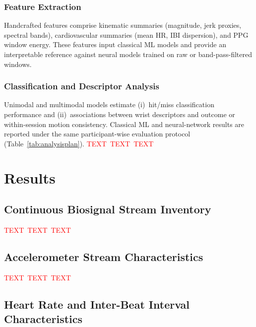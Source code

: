 \documentclass[sensors,article,submit,pdftex,moreauthors]{Definitions/mdpi}
\newcommand{\ph}{\textcolor{red}{TEXT}}
\newcommand{\phh}{\ph{}\ \ph{}\ \ph{}}
\begin{document}
\subsubsection{Feature Extraction}



Handcrafted features comprise kinematic summaries (magnitude, jerk proxies, spectral bands), cardiovascular summaries (mean HR, IBI dispersion), and PPG window energy. These features input classical ML models and provide an interpretable reference against neural models trained on raw or band-pass-filtered windows.



\subsubsection{Classification and Descriptor Analysis}



Unimodal and multimodal models estimate (i)~hit/miss classification performance and (ii)~associations between wrist descriptors and outcome or within-session motion consistency. Classical ML and neural-network results are reported under the same participant-wise evaluation protocol (Table~\ref{tab:analysisplan}). \phh




\section{Results}



\subsection{Continuous Biosignal Stream Inventory}



\phh



\subsection{Accelerometer Stream Characteristics}



\phh



\subsection{Heart Rate and Inter-Beat Interval Characteristics}
\end{document}
